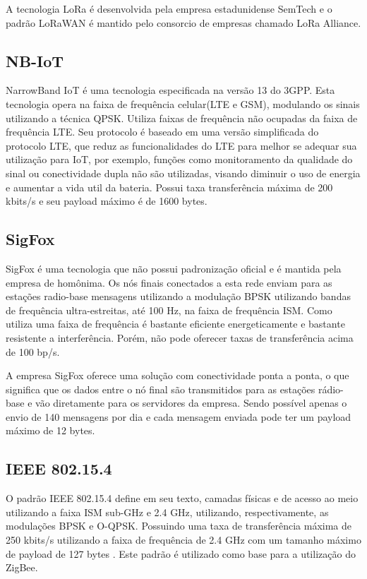 A tecnologia LoRa é desenvolvida pela empresa estadunidense SemTech e o padrão LoRaWAN é mantido pelo consorcio de empresas chamado LoRa Alliance.

\subsection{NB-IoT}
NarrowBand IoT é uma tecnologia especificada na versão 13 do 3GPP. Esta tecnologia opera na faixa de frequência celular(LTE e GSM), modulando os sinais utilizando a técnica QPSK. Utiliza faixas de frequência não ocupadas da faixa de frequência LTE. Seu protocolo é baseado em uma versão simplificada do protocolo LTE, que reduz as funcionalidades do LTE para melhor se adequar sua utilização para IoT, por exemplo, funções como monitoramento da qualidade do sinal ou conectividade dupla não são utilizadas, visando diminuir o uso de energia e aumentar a vida util da bateria. Possui taxa transferência máxima de 200 kbits/s e seu payload máximo é de 1600 bytes.

\subsection{SigFox}
SigFox é uma tecnologia que não possui padronização oficial e é mantida pela empresa de homônima. Os nós finais conectados a esta rede enviam para as estações radio-base mensagens utilizando a modulação BPSK utilizando bandas de frequência ultra-estreitas, até 100 Hz, na faixa de frequência ISM. Como utiliza uma faixa de frequência é bastante eficiente energeticamente e bastante resistente a interferência. Porém, não pode oferecer taxas de transferência acima de 100 bp/s.

A empresa SigFox oferece uma solução com conectividade ponta a ponta, o que significa que os dados entre o nó final são transmitidos para as estações rádio-base e vão diretamente para os servidores da empresa. Sendo possível apenas o envio de 140 mensagens por dia e cada mensagem enviada pode ter um payload máximo de 12 bytes.

\subsection{IEEE 802.15.4}
O padrão IEEE 802.15.4 define em seu texto, camadas físicas e de acesso ao meio utilizando a faixa ISM sub-GHz e 2.4 GHz, utilizando, respectivamente, as modulações BPSK e O-QPSK. Possuindo uma taxa de transferência máxima de 250 kbits/s utilizando a faixa de frequência de 2.4 GHz com um tamanho máximo de payload de 127 bytes \cite{munoz2018overview}\cite{gomes2017estimaccao}. Este padrão é utilizado como base para a utilização do ZigBee.

